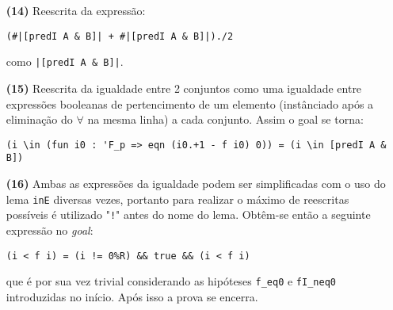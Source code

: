 \begin{enumerate}[label=\textbf{\roman*.}]
\begin{enumerate}[label=\textbf{(\alph*)}]
\begin{enumerate}[label=\textbf{(\alph{enumii}.\arabic*)}]
\begin{enumerate}[listparindent=\parindent]
                                \item[\textbf{(14)}] Reescrita da expressão:
                                        
                                        \begin{lstlisting}[language=coq,frame=single,tabsize=1]
(#|[predI A & B]| + #|[predI A & B]|)./2
                                        \end{lstlisting}
                                como \lstinline[language=coq]!|[predI A & B]|!.
                                
                                \item[\textbf{(15)}] Reescrita da igualdade entre 2 conjuntos como uma igualdade entre expressões booleanas de pertencimento de um elemento (instânciado após a eliminação do $\forall$ na mesma linha) a cada conjunto. Assim o goal se torna:
                                
                                        \begin{lstlisting}[language=coq,frame=single,tabsize=1]
(i \in (fun i0 : 'F_p => eqn (i0.+1 - f i0) 0)) = (i \in [predI A & B])
                                        \end{lstlisting}

                                \item[\textbf{(16)}] Ambas as expressões da igualdade podem ser simplificadas com o uso do lema \lstinline[language=coq]|inE| diversas vezes, portanto para realizar o máximo de reescritas possíveis é utilizado "\lstinline[language=coq]|!|" antes do nome do lema. Obtêm-se então a seguinte expressão no \textit{goal}:
                                
                                        \begin{lstlisting}[language=coq,frame=single,tabsize=1]
(i < f i) = (i != 0%R) && true && (i < f i)
                                        \end{lstlisting}
                                que é por sua vez trivial considerando as hipóteses \lstinline[language=coq]|f_eq0| e \lstinline[language=coq]|fI_neq0| introduzidas no início. Após isso a prova se encerra.
                                

                        \end{enumerate}

                \end{enumerate}

        \end{enumerate}



\end{enumerate}

